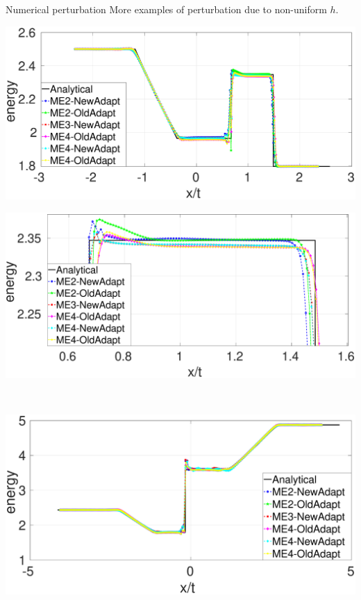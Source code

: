 \documentclass{beamer}
\begin{document}
\begin{frame}{Numerical perturbation}
More examples of perturbation due to non-uniform $h$.\\
\begin{minipage}{0.49 \textwidth}
\begin{minipage}{0.49 \textwidth}
\includegraphics[width=0.99 \textwidth]{./Chapter-3/Figures/Sod-NewAdpt-OldAdpt-e}
\end{minipage}
\begin{minipage}{0.49 \textwidth}
\includegraphics[width=0.99 \textwidth]{./Chapter-3/Figures/Sod-NewAdpt-OldAdpt-e-zoom}
\end{minipage}
\\
\begin{minipage}{0.49\textwidth}
\includegraphics[width=0.99 \textwidth]{./Chapter-3/Figures/d-exp-NewAdpt-OldAdpt-e}

\end{minipage}
\end{minipage}
\end{frame}
\end{document}
